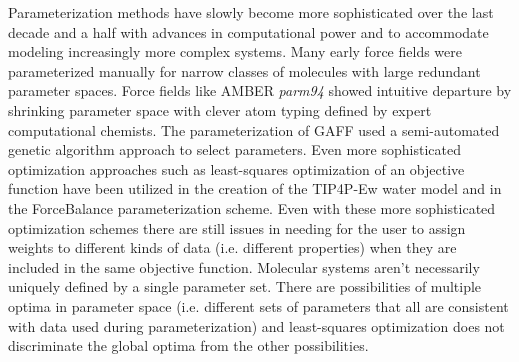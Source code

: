 \documentclass[rmp,nofootinbib,superscriptaddress,12pt,tightenlines,notitlepage]{revtex4-1}
\begin{document}
Parameterization methods have slowly become more sophisticated over the last decade and a 
half with advances in computational power and to accommodate modeling increasingly more complex systems. Many early 
force fields were parameterized manually for narrow classes of molecules with large redundant parameter spaces.\cite{mm1} Force fields like AMBER 
\textit{parm94} showed intuitive departure by shrinking parameter space with clever atom typing defined by expert 
computational chemists.\cite{parm94} The parameterization of GAFF used a semi-automated genetic algorithm approach 
to select parameters.\cite{amber} Even more sophisticated optimization approaches such as least-squares optimization 
of an objective function have been utilized in the creation of the TIP4P-Ew water model\cite{tip4pew} and in the 
ForceBalance parameterization scheme\cite{FB1,FB2,FB3}. Even with these more sophisticated optimization schemes there 
are still issues in needing for the user to assign weights to different kinds of data (i.e. different properties) when 
they are included in the same objective function. Molecular systems aren't necessarily uniquely defined by a single 
parameter set. There are possibilities of multiple optima in parameter space (i.e. different sets of parameters that 
all are consistent with data used during parameterization) and least-squares optimization does not discriminate the 
global optima from the other possibilities.
\end{document}
